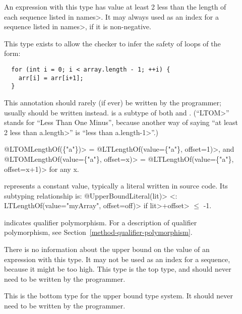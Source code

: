 \begin{description}
\item[]
  An expression with this type
  has value at least 2 less than the length of each sequence listed in \<names>.
  It may always used as an index for a sequence listed in \<names>, if it is
  non-negative.

  This type exists to allow the checker to infer the safety of loops of
  the form:
\begin{Verbatim}
  for (int i = 0; i < array.length - 1; ++i) {
    arr[i] = arr[i+1];
  }
\end{Verbatim}
  This annotation should rarely (if ever) be written by the programmer; usually
  should be written instead.
   is a subtype of both
   and .
  (``\<LTOM>'' stands for ``Less Than One Minus'', because another way of
  saying ``at least 2 less than \<a.length>'' is ``less than \<a.length-1>''.)

  \<@LTOMLengthOf(\{"a"\})> = \<@LTLengthOf(value=\{"a"\}, offset=1)>, and \\
  \<@LTOMLengthOf(value=\{"a"\}, offset=x)> = \<@LTLengthOf(value=\{"a"\},
  offset=x+1)> for any x.

\item[]
  represents a constant value, typically a literal written in source code.
  Its subtyping relationship is:
  \<@UpperBoundLiteral(lit)> <: \<LTLengthOf(value="myArray", offset=off)>
  if \<lit>+\<offset> $\le$ -1.

\item[]
  indicates qualifier polymorphism.
  For a description of qualifier polymorphism, see
  Section~\ref{method-qualifier-polymorphism}.

\item[]
  There is no information about the upper bound on the value of an expression with this type.
  It may not be used as an index for a sequence, because it might be too high.
  This type is the top type, and should never need to be written by the
  programmer.

\item[]
  This is the bottom type for the upper bound type system. It should
  never need to be written by the programmer.

\end{description}

